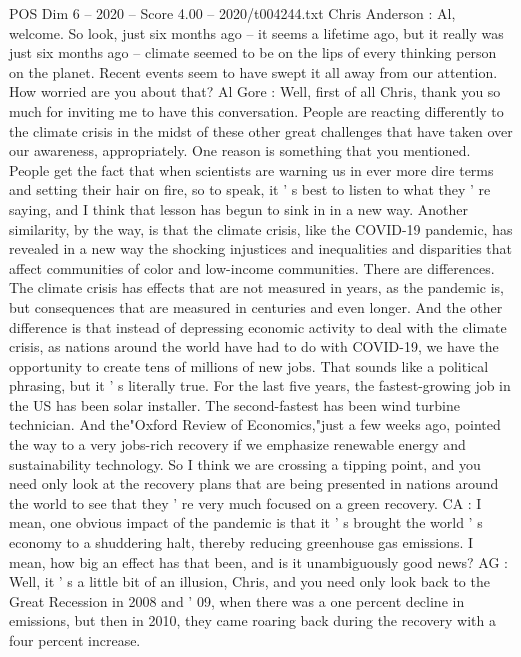 \begin{textsample}{POS Dim 6 – 2020 – Score 4.00 – 2020/t004244.txt}  \label{ex:f6_pos_055}
Chris Anderson : Al, welcome.
So look, just six months ago -- it seems a lifetime ago, but it really was just six months ago -- climate seemed to be on the lips of every thinking person on the planet.
Recent events seem to have swept it all away from our attention.
How worried are you about that?
Al Gore : Well, first of all Chris, thank you so much for inviting me to have this conversation.
People are reacting differently to the climate crisis in the midst of these other great challenges that have taken over our awareness, appropriately.
One reason is something that you mentioned.
People get the fact that when scientists are warning us in ever more dire terms and setting their hair on fire, so to speak, it ' s best to listen to what they ' re saying, and I think that lesson has begun to sink in in a new way.
Another similarity, by the way, is that the climate crisis, like the COVID-19 pandemic, has revealed in a new way the shocking injustices and inequalities and disparities that affect communities of color and low-income communities.
There are differences.
The climate crisis has effects that are not measured in years, as the pandemic is, but consequences that are measured in centuries and even longer.
And the other difference is that instead of depressing economic activity to deal with the climate crisis, as nations around the world have had to do with COVID-19, we have the opportunity to create tens of millions of new jobs.
That sounds like a political phrasing, but it ' s literally true.
For the last five years, the fastest-growing job in the US has been solar installer.
The second-fastest has been wind turbine technician.
And the"Oxford Review of Economics,"just a few weeks ago, pointed the way to a very jobs-rich recovery if we emphasize renewable energy and sustainability technology.
So I think we are crossing a tipping point, and you need only look at the recovery plans that are being presented in nations around the world to see that they ' re very much focused on a green recovery.
CA : I mean, one obvious impact of the pandemic is that it ' s brought the world ' s economy to a shuddering halt, thereby reducing greenhouse gas emissions.
I mean, how big an effect has that been, and is it unambiguously good news?
AG : Well, it ' s a little bit of an illusion, Chris, and you need only look back to the Great Recession in 2008 and ' 09, when there was a one percent decline in emissions, but then in 2010, they came roaring back during the recovery with a four percent increase.

\end{textsample}
